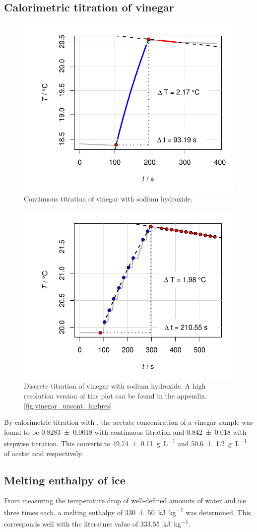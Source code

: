 \subsection{Calorimetric titration of vinegar}

\begin{figure}[H]
    \centering
    \includegraphics[width=.5\textwidth]{figures/plots/vinegar_cont.pdf}
    \caption{Continuous titration of vinegar with sodium hydroxide.}
    \label{fig:vinegar_cont}
\end{figure}

\begin{figure}[H]
    \centering
    \includegraphics[width=.5\textwidth]{figures/plots/vinegar_uncont.pdf}
    \caption{Discrete titration of vinegar with sodium hydroxide. A high resolution version of this plot can be found in the appendix.\ref{fig:vinegar_uncont_highres}}
    \label{fig:vinegar_uncont}
\end{figure}

By calorimetric titration with , the acetate concentration of a vinegar sample was found to be \qty{0.8283 \pm 0.0018}{\M} with continuous titration and \qty{0.842 \pm 0.018}{\M} with stepwise titration. This converts to \qty{49.74 \pm 0.11}{\gram\per\liter} and \qty{50.6 \pm 1.2}{\gram\per\liter} of acetic acid respectively.



\subsection{Melting enthalpy of ice}

From measuring the temperature drop of well-defined amounts of water and ice three times each, a melting enthalpy of \qty{330 \pm 50}{\kilo\joule\per\kilo\gram} was determined. This corresponds well with the literature value of \qty{333.55}{\kilo\joule\per\kilo\gram}.\cite{crc}


